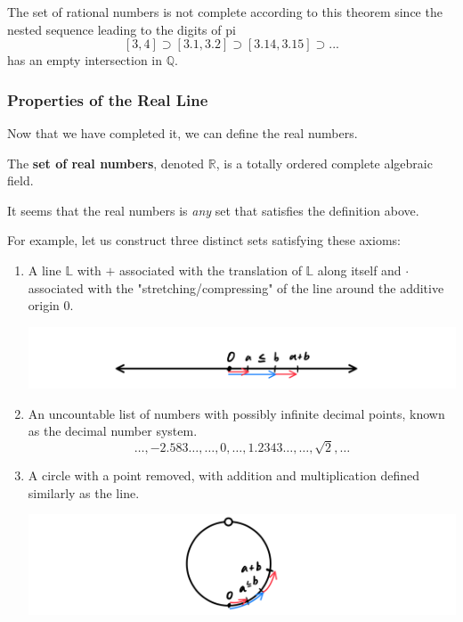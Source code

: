 \documentclass{article}
\begin{document}
      The set of rational numbers is not complete according to this theorem since the nested sequence leading to the digits of pi
      \[[3,4] \supset [3.1,3.2] \supset [3.14,3.15] \supset ... \]
      has an empty intersection in $\mathbb{Q}$. 

    \subsubsection{Properties of the Real Line} 

      Now that we have completed it, we can define the real numbers. 

      \begin{definition}
        The \textbf{set of real numbers}, denoted $\mathbb{R}$, is a totally ordered complete algebraic field. 
      \end{definition} 

      It seems that the real numbers is \textit{any} set that satisfies the definition above. 

      \begin{example}
        For example, let us construct three distinct sets satisfying these axioms: 
        \begin{enumerate}
          \item A line $\mathbb{L}$ with $+$ associated with the translation of $\mathbb{L}$ along itself and $\cdot$ associated with the "stretching/compressing" of the line around the additive origin $0$. 
          \begin{center}
            \includegraphics[scale=0.25]{img/Real_Number_Line_Ordered.PNG}
          \end{center}
          \item An uncountable list of numbers with possibly infinite decimal points, known as the decimal number system. 
          \[\ldots, -2.583\ldots, \ldots , 0, \ldots, 1.2343\ldots, \ldots, \sqrt{2}, \ldots\]
          \item A circle with a point removed, with addition and multiplication defined similarly as the line. 
          \begin{center}
            \includegraphics[scale=0.25]{img/Real_Number_Circle_Ordered.PNG}
          \end{center}
        \end{enumerate}
      \end{example}
\end{document}
